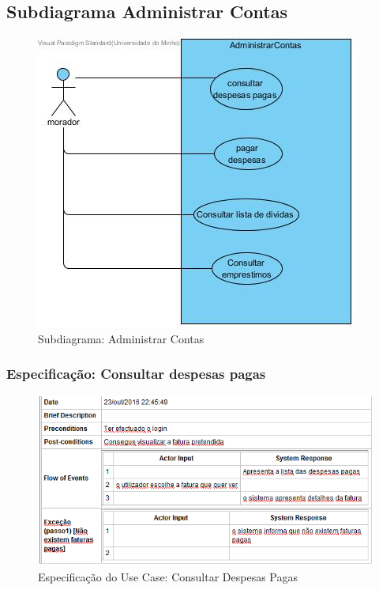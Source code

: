 \subsection{Subdiagrama Administrar Contas}
\begin{figure}[htb!]
	\centering
	\includegraphics[scale=0.6]{imagens/UseCase/despesasMorador}  
	\caption{Subdiagrama: Administrar Contas }  
\end{figure}

\newpage

\subsubsection{Especificação: Consultar despesas pagas }

\begin{figure}[htb!]
	\centering
	\includegraphics[scale=0.6]{imagens/Especificacoes/consultardespesaspagas}  
	\caption{Especificação do Use Case: Consultar Despesas Pagas}  
\end{figure}


